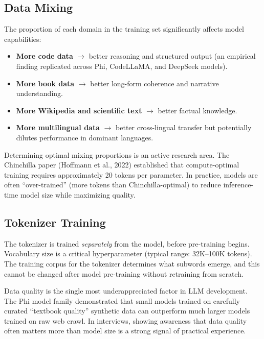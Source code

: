 \subsection{Data Mixing}

The proportion of each domain in the training set significantly affects model
capabilities:

\begin{itemize}
    \item \textbf{More code data} $\rightarrow$ better reasoning and structured
          output (an empirical finding replicated across Phi, CodeLLaMA, and
          DeepSeek models).
    \item \textbf{More book data} $\rightarrow$ better long-form coherence and
          narrative understanding.
    \item \textbf{More Wikipedia and scientific text} $\rightarrow$ better
          factual knowledge.
    \item \textbf{More multilingual data} $\rightarrow$ better cross-lingual
          transfer but potentially dilutes performance in dominant languages.
\end{itemize}

Determining optimal mixing proportions is an active research area.  The Chinchilla
paper (Hoffmann et al., 2022) established that compute-optimal training requires
approximately 20 tokens per parameter.  In practice, models are often
``over-trained'' (more tokens than Chinchilla-optimal) to reduce inference-time
model size while maximizing quality.

\subsection{Tokenizer Training}

The tokenizer is trained \emph{separately} from the model, before pre-training
begins.  Vocabulary size is a critical hyperparameter (typical range: 32K--100K
tokens).  The training corpus for the tokenizer determines what subwords emerge,
and this cannot be changed after model pre-training without retraining from
scratch.

\begin{warningbox}
Data quality is the single most underappreciated factor in LLM development.
The Phi model family demonstrated that small models trained on carefully curated
``textbook quality'' synthetic data can outperform much larger models trained on
raw web crawl.  In interviews, showing awareness that data quality often matters
more than model size is a strong signal of practical experience.
\end{warningbox}


